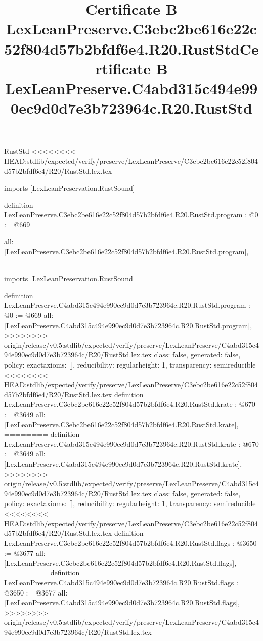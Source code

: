 \begin{lexlean}{RustStd}
<<<<<<<< HEAD:stdlib/expected/verify/preserve/LexLeanPreserve/C3ebc2be616e22c52f804d57b2bfdf6e4/R20/RustStd.lex.tex
\title{Certificate B LexLeanPreserve.C3ebc2be616e22c52f804d57b2bfdf6e4.R20.RustStd}
\begin{coremodule}
imports [LexLeanPreservation.RustSound]

definition LexLeanPreserve.C3ebc2be616e22c52f804d57b2bfdf6e4.R20.RustStd.program : @0 := @669 {
  all: [LexLeanPreserve.C3ebc2be616e22c52f804d57b2bfdf6e4.R20.RustStd.program],
========
\title{Certificate B LexLeanPreserve.C4abd315c494e990ec9d0d7e3b723964c.R20.RustStd}
\begin{coremodule}
imports [LexLeanPreservation.RustSound]

definition LexLeanPreserve.C4abd315c494e990ec9d0d7e3b723964c.R20.RustStd.program : @0 := @669 {
  all: [LexLeanPreserve.C4abd315c494e990ec9d0d7e3b723964c.R20.RustStd.program],
>>>>>>>> origin/release/v0.5:stdlib/expected/verify/preserve/LexLeanPreserve/C4abd315c494e990ec9d0d7e3b723964c/R20/RustStd.lex.tex
  class: false,
  generated: false,
  policy: exact{axioms: []},
  reducibility: regular{height: 1},
  transparency: semireducible
}
<<<<<<<< HEAD:stdlib/expected/verify/preserve/LexLeanPreserve/C3ebc2be616e22c52f804d57b2bfdf6e4/R20/RustStd.lex.tex
definition LexLeanPreserve.C3ebc2be616e22c52f804d57b2bfdf6e4.R20.RustStd.krate : @670 := @3649 {
  all: [LexLeanPreserve.C3ebc2be616e22c52f804d57b2bfdf6e4.R20.RustStd.krate],
========
definition LexLeanPreserve.C4abd315c494e990ec9d0d7e3b723964c.R20.RustStd.krate : @670 := @3649 {
  all: [LexLeanPreserve.C4abd315c494e990ec9d0d7e3b723964c.R20.RustStd.krate],
>>>>>>>> origin/release/v0.5:stdlib/expected/verify/preserve/LexLeanPreserve/C4abd315c494e990ec9d0d7e3b723964c/R20/RustStd.lex.tex
  class: false,
  generated: false,
  policy: exact{axioms: []},
  reducibility: regular{height: 1},
  transparency: semireducible
}
<<<<<<<< HEAD:stdlib/expected/verify/preserve/LexLeanPreserve/C3ebc2be616e22c52f804d57b2bfdf6e4/R20/RustStd.lex.tex
definition LexLeanPreserve.C3ebc2be616e22c52f804d57b2bfdf6e4.R20.RustStd.flags : @3650 := @3677 {
  all: [LexLeanPreserve.C3ebc2be616e22c52f804d57b2bfdf6e4.R20.RustStd.flags],
========
definition LexLeanPreserve.C4abd315c494e990ec9d0d7e3b723964c.R20.RustStd.flags : @3650 := @3677 {
  all: [LexLeanPreserve.C4abd315c494e990ec9d0d7e3b723964c.R20.RustStd.flags],
>>>>>>>> origin/release/v0.5:stdlib/expected/verify/preserve/LexLeanPreserve/C4abd315c494e990ec9d0d7e3b723964c/R20/RustStd.lex.tex
}}}
\end{coremodule}}
\end{coremodule}
\end{lexlean}
